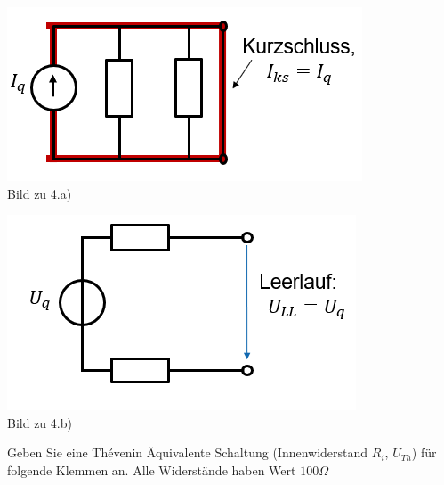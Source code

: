 																				\iend
\begin{center}


																				\begin{minipage}{0.4\textwidth}
																				\begin{center}
																					\includegraphics[scale=0.7]{img/the_ks.PNG} \\
																					Bild zu 4.a)
																				\end{center}



																				\end{minipage}
																				\begin{minipage}{0.4\textwidth}
																				\begin{center}
																					\includegraphics[scale=0.7]{img/the_ll.PNG}\\
																					Bild zu 4.b)
																				\end{center}
																				\end{minipage}

																				\end{center}





																				\newpage
																				\beginbsp
																				Geben Sie eine Thévenin Äquivalente Schaltung (Innenwiderstand $R_i$, $U_{Th}$) für folgende Klemmen an. Alle Widerstände haben Wert $100\Omega$ \\


